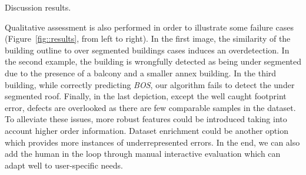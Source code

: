 \documentclass[conference]{IEEEtran}
\begin{document}
Discussion results.

Qualitative assessment is also performed in order to illustrate some failure cases (Figure~\ref{fig::results}, from left to right). In the first image, the similarity of the building outline to over segmented buildings cases induces an overdetection. In the second example, the building is wrongfully detected as being under segmented due to the presence of a balcony and a smaller annex building. In the third building, while correctly predicting \textit{BOS}, our algorithm fails to detect the under segmented roof. Finally, in the last depiction, except the well caught footprint error, defects are overlooked as there are few comparable samples in the dataset. To alleviate these issues, more robust features could be introduced taking into account higher order information. Dataset enrichment could be another option which provides more instances of underrepresented errors. In the end, we can also add the human in the loop through manual interactive evaluation which can adapt well to user-specific needs.
\end{document}
